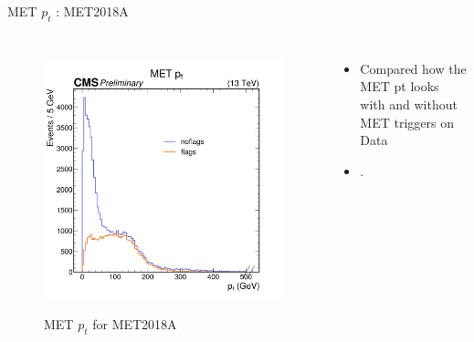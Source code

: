\documentclass[10pt,xcolor=dvipsnames]{beamer}
\begin{document}
  \begin{frame}[fragile]{MET $p_t$ : MET2018A} 
  \begin{columns}
  \begin{figure} 
  \centering 
   \includegraphics[width=1\textwidth]{../Archive/KinemPlots/DataptMETflags.png }
  \label{METDataflagpt} 
  \caption{MET $p_t$ for MET2018A}
  \end{figure} 
  \begin{itemize} 
  \raggedright 
  \small
  \item Compared how the MET pt looks with and without MET triggers on Data
  \item .
  \end{itemize}
  \end{columns} 
  \end{frame}
\end{document}
